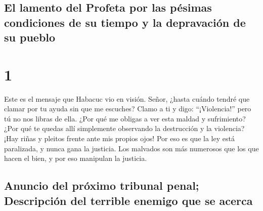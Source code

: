 \hypertarget{el-lamento-del-profeta-por-las-puxe9simas-condiciones-de-su-tiempo-y-la-depravaciuxf3n-de-su-pueblo}{%
\subsection{El lamento del Profeta por las pésimas condiciones de su
tiempo y la depravación de su
pueblo}\label{el-lamento-del-profeta-por-las-puxe9simas-condiciones-de-su-tiempo-y-la-depravaciuxf3n-de-su-pueblo}}

\hypertarget{section}{%
\section{1}\label{section}}

 Este es el mensaje que Habacuc vio en visión.
 Señor, ¿hasta cuándo tendré que clamar por tu ayuda sin
que me escuches? Clamo a ti y digo: ``¡Violencia!'' pero tú no nos
libras de ella.  ¿Por qué me obligas a ver esta maldad y
sufrimiento? ¿Por qué te quedas allí simplemente observando la
destrucción y la violencia? ¡Hay riñas y pleitos frente ante mis propios
ojos!  Por eso es que la ley está paralizada, y nunca gana
la justicia. Los malvados son más numerosos que los que hacen el bien, y
por eso manipulan la justicia.

\hypertarget{anuncio-del-pruxf3ximo-tribunal-penal-descripciuxf3n-del-terrible-enemigo-que-se-acerca}{%
\subsection{Anuncio del próximo tribunal penal; Descripción del terrible
enemigo que se
acerca}\label{anuncio-del-pruxf3ximo-tribunal-penal-descripciuxf3n-del-terrible-enemigo-que-se-acerca}}


